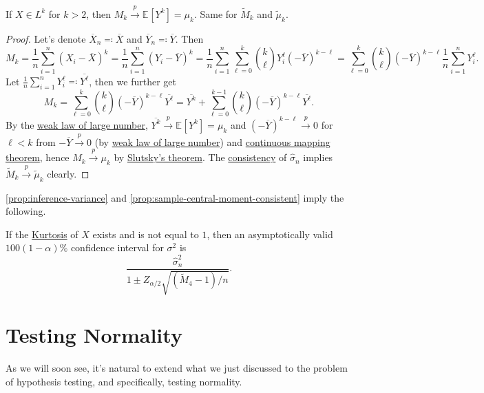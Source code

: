 \begin{proposition}\label{prop:sample-central-moment-consistent}
	If \(X \in L^k\) for \(k > 2\), then \(M_k \overset{p}{\to} \mathbb{E}_{}[Y^k] = \mu _k\). Same for \(\widetilde{M} _k\) and \(\widetilde{\mu} _k\).
\end{proposition}
\begin{proof}
	Let's denote \(\overline{X} _n \eqqcolon \overline{X} \) and \(\overline{Y} _n \eqqcolon \overline{Y} \). Then
	\[
		M_k
		= \frac{1}{n} \sum_{i=1}^{n} (X_i - \overline{X} )^k
		= \frac{1}{n} \sum_{i=1}^{n} (Y_i - \overline{Y} )^k
		= \frac{1}{n} \sum_{i=1}^{n} \sum_{\ell =0}^{k} \binom{k}{\ell } Y_i^{\ell } (-\overline{Y} )^{k-\ell }
		= \sum_{\ell =0}^{k} \binom{k}{\ell } (-\overline{Y} )^{k - \ell } \frac{1}{n} \sum_{i=1}^{n} Y_i^{\ell }.
	\]
	Let \(\frac{1}{n} \sum_{i=1}^{n} Y_i^{\ell } \eqqcolon \overline{Y^{\ell } } \), then we further get
	\begin{equation}\label{eq:sample-central-moment}
		M_k
		= \sum_{\ell =0}^{k} \binom{k}{\ell } (- \overline{Y} )^{k - \ell } \overline{Y^{\ell } }
		= \overline{Y^k} + \sum_{\ell =0}^{k-1} \binom{k}{\ell } (-\overline{Y} )^{k-\ell }  \overline{Y^{\ell } }.
	\end{equation}
	By the \hyperref[thm:WLLN]{weak law of large number}, \(\overline{Y^k} \overset{p}{\to} \mathbb{E}_{}[Y^k] = \mu _k\) and \((-\overline{Y} )^{k-\ell } \overset{p}{\to} 0\) for \(\ell < k\) from \(-\overline{Y} \overset{p}{\to} 0\) (by \hyperref[thm:WLLN]{weak law of large number}) and \hyperref[thm:continuous-mapping]{continuous mapping theorem}, hence \(M_k \overset{p}{\to} \mu _k\) by \hyperref[col:Slutsky]{Slutsky's theorem}. The \hyperref[def:consistent]{consistency} of \(\hat{\sigma} _n\) implies \(\widetilde{M} _k \overset{p}{\to} \widetilde{\mu} _k\) clearly.
\end{proof}

\autoref{prop:inference-variance} and \autoref{prop:sample-central-moment-consistent} imply the following.

\begin{corollary}\label{col:inference-variance-CI}
	If the \hyperref[def:Kurtosis]{Kurtosis} of \(X\) exists and is not equal to \(1\), then an asymptotically valid \(100 (1 - \alpha )\%\) confidence interval for \(\sigma ^2\) is
	\[
		\frac{\hat{\sigma} _n^2}{1 \pm Z_{\alpha / 2} \sqrt{(\widetilde{M} _4 - 1) / n} }.
	\]
\end{corollary}

\section{Testing Normality}
As we will soon see, it's natural to extend what we just discussed to the problem of hypothesis testing, and specifically, testing normality.


